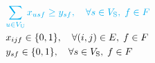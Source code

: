 \documentclass[10pt, letterpaper]{IEEEtran}
\newcommand\cyan[1]{\textcolor{cyan}{#1}}
\begin{document}
\begin{CJK}{UTF8}{ipxm}
{\begin{subequations}
\begin{align}
  &\cyan{\sum_{u \in V_{\rm{U}}} x_{usf} \geq y_{sf} , \quad \forall s \in V_{\rm{S}}, \; f \in F} \label{OSA-PSO l} \\
  &x_{ijf} \in \{0,1\}, \quad \forall (i,j) \in E, \; f \in F \label{OSA-PSO m} \\
  &y_{sf} \in \{0,1\}, \quad \forall s \in V_{\rm{S}}, \; f \in F \label{OSA-PSO n}
  \end{align}
\end{subequations}
}

\end{CJK}
\end{document}
